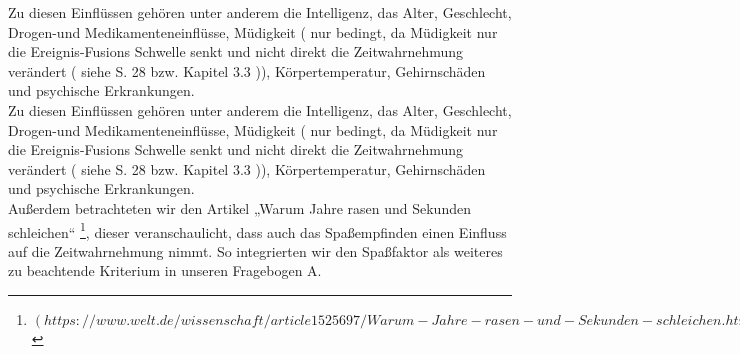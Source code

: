 \documentclass{Paper}
\begin{document}
Zu diesen Einflüssen gehören unter anderem die Intelligenz, das Alter, Geschlecht, Drogen-und Medikamenteneinflüsse, Müdigkeit ( nur bedingt, da Müdigkeit nur die Ereignis-Fusions Schwelle senkt und nicht direkt die Zeitwahrnehmung verändert ( siehe S. 28 bzw. Kapitel 3.3 )), Körpertemperatur, Gehirnschäden und psychische Erkrankungen. \\
Zu diesen Einflüssen gehören unter anderem die Intelligenz, das Alter, Geschlecht, Drogen-und Medikamenteneinflüsse, Müdigkeit ( nur bedingt, da Müdigkeit nur die Ereignis-Fusions Schwelle senkt und nicht direkt die Zeitwahrnehmung verändert ( siehe S. 28 bzw. Kapitel 3.3 )), Körpertemperatur, Gehirnschäden und psychische Erkrankungen. 
\\Außerdem betrachteten wir den Artikel „Warum Jahre rasen und Sekunden schleichen“ \footnote{$(https://www.welt.de/wissenschaft/article1525697/Warum-Jahre-rasen-und-Sekunden-schleichen.html)$}, dieser veranschaulicht, dass auch das Spaßempfinden einen Einfluss auf die Zeitwahrnehmung nimmt. So integrierten wir den Spaßfaktor als weiteres zu beachtende Kriterium in unseren Fragebogen A. 
\end{document}
